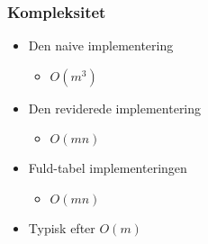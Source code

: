 \begin{frame}
\frametitle{Kompleksitet}
\begin{itemize}
\item Den naive implementering 
	\begin{itemize}
	\item $O(m^3)$ 
	\end{itemize}
\item Den reviderede implementering 
	\begin{itemize}
	\item $O(mn)$
	\end{itemize}
\item Fuld-tabel implementeringen
	\begin{itemize}
	\item $O(mn)$
	\end{itemize} 
\item Typisk efter $O(m)$
\end{itemize}
\end{frame}